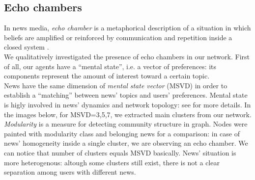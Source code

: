 \subsection{Echo chambers}
In news media, \textit{echo chamber} is a metaphorical description of a situation in which beliefs are amplified or reinforced by communication and repetition inside a closed system \cite{echochamwiki}\cite{echocham}.\\
We qualitatively investigated the presence of echo chambers in our network.
First of all, our agents have a ``mental  state'', i.e. a vector of preferences: its components represent the amount of interest toward a certain topic.\\
 News have the same dimension of \textit{mental state vector} (MSVD) in order to establish a ``matching'' between news' topics and users' preferences. 
 Mental state is higly involved in news' dynamics and network topology: see \cite{ourpaper} for more details.
 In the images below, for MSVD=3,5,7, we extracted main clusters from our network.
 \textit{Modularity} is a measure for detecting community structure in graph\cite{modulwiki}.
 Nodes were painted with modularity class and belonging news for a comparison: in case of news' homogeneity inside a single cluster, we are observing an echo chamber.
 We can notice that number of clusters equals MSVD basically.
 News' situation is more heterogenous: altough some clusters still exist, there is not a clear separation among users with different news. 
 
